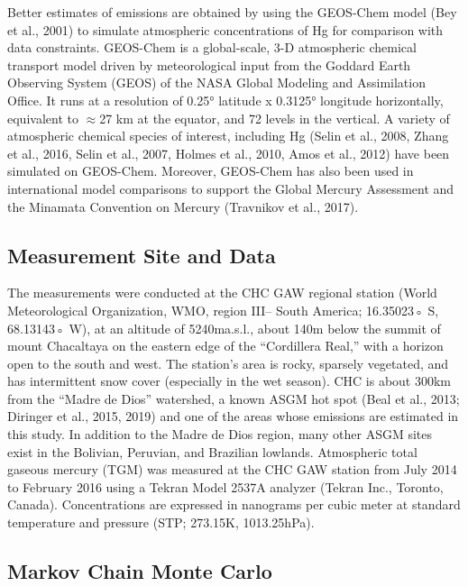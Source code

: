 Better estimates of emissions are obtained by using the GEOS-Chem model (Bey et al., 2001) to simulate atmospheric concentrations of Hg for comparison with data constraints. GEOS-Chem is a global-scale, 3-D atmospheric chemical transport model driven by meteorological input from the Goddard Earth Observing System (GEOS) of the NASA Global Modeling and Assimilation Office. It runs at a resolution of 0.25° latitude x 0.3125° longitude horizontally, equivalent to $\approx$27 km at the equator, and 72 levels in the vertical. A variety of atmospheric chemical species of interest, including Hg (Selin et al., 2008, Zhang et al., 2016, Selin et al., 2007, Holmes et al., 2010, Amos et al., 2012) have been simulated on GEOS-Chem. Moreover, GEOS-Chem has also been used in international model comparisons to support the Global Mercury Assessment and the Minamata Convention on Mercury (Travnikov et al., 2017).


\subsection*{Measurement Site and Data}

The measurements were conducted at the CHC GAW regional station (World Meteorological Organization, WMO, region III-- South America; 16.35023◦ S, 68.13143◦ W), at an altitude of 5240ma.s.l., about 140m below the summit of mount Chacaltaya on the eastern edge of the ``Cordillera Real,'' with a horizon open to the south and west. The station's area is rocky, sparsely vegetated, and has intermittent snow cover (especially in the wet season). CHC is about 300km from the ``Madre de Dios'' watershed, a known ASGM hot spot (Beal et al., 2013; Diringer et al., 2015, 2019) and one of the areas whose emissions are estimated in this study. In addition to the Madre de Dios region, many other ASGM sites exist in the Bolivian, Peruvian, and Brazilian lowlands. Atmospheric total gaseous mercury (TGM) was measured at the CHC GAW station from July 2014 to February 2016 using a Tekran Model 2537A analyzer (Tekran Inc., Toronto, Canada). Concentrations are expressed in nanograms per cubic meter at standard temperature and pressure (STP; 273.15K, 1013.25hPa).

\subsection*{Markov Chain Monte Carlo}

